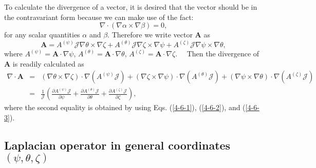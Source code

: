 \documentclass{llncs}
\begin{document}
To calculate the divergence of a vector, it is desired that the vector should
be in the contravariant form because we can make use of the fact:
\begin{equation}
  \nabla \cdot (\nabla \alpha \times \nabla \beta) = 0,
\end{equation}
for any scalar quantities $\alpha$ and $\beta$. Therefore we write vector
$\mathbf{A}$ as
\begin{equation}
  \mathbf{A}= A^{(\psi)} \mathcal{J} \nabla \theta \times \nabla \zeta +
  A^{(\theta)} \mathcal{J} \nabla \zeta \times \nabla \psi + A^{(\zeta)}
  \mathcal{J} \nabla \psi \times \nabla \theta,
\end{equation}
where $A^{(\psi)} =\mathbf{A} \cdot \nabla \psi$, $A^{(\theta)} =\mathbf{A}
\cdot \nabla \theta$, $A^{(\zeta)} =\mathbf{A} \cdot \nabla \zeta$. \ \ Then
the divergence of $\mathbf{A}$ is readily calculated as
\begin{eqnarray}
  \nabla \cdot \mathbf{A} & = & (\nabla \theta \times \nabla \zeta) \cdot
  \nabla (A^{(\psi)} \mathcal{J}) + (\nabla \zeta \times \nabla \psi) \cdot
  \nabla (A^{(\theta)} \mathcal{J}) + (\nabla \psi \times \nabla \theta) \cdot
  \nabla (A^{(\zeta)} \mathcal{J}) \\
  & = & \frac{1}{\mathcal{J}} \left( \frac{\partial A^{(\psi)}
  \mathcal{J}}{\partial \psi} + \frac{\partial A^{(\theta)}
  \mathcal{J}}{\partial \theta} + \frac{\partial A^{(\zeta)}
  \mathcal{J}}{\partial \zeta} \right),  \label{6-8-e5}
\end{eqnarray}
where the second equality is obtained by using Eqs. (\ref{4-6-1}),
(\ref{4-6-2}), and (\ref{4-6-3}).

\subsection{Laplacian operator in general coordinates $(\psi, \theta, \zeta)$}
\end{document}
